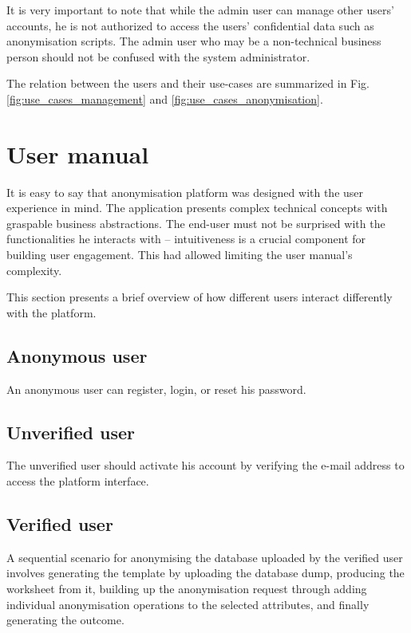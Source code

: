 \documentclass[a4paper,twoside,12pt]{book}
\begin{document}
It is very important to note that while the admin user can manage other users' accounts, he is not authorized to access the users' confidential data such as anonymisation scripts. The admin user who may be a non-technical business person should not be confused with the system administrator.

The relation between the users and their use-cases are summarized in Fig. \ref{fig:use_cases_management} and \ref{fig:use_cases_anonymisation}.

\section{User manual}

It is easy to say that anonymisation platform was designed with the user experience in mind. The application presents complex technical concepts with graspable business abstractions. The end-user must not be surprised with the functionalities he interacts with -- intuitiveness is a crucial component for building user engagement. This had allowed limiting the user manual's complexity.

This section presents a brief overview of how different users interact differently with the platform.

\subsection{Anonymous user}

An anonymous user can register, login, or reset his password.

\subsection{Unverified user}

The unverified user should activate his account by verifying the e-mail address to access the platform interface.

\subsection{Verified user}

A sequential scenario for anonymising the database uploaded by the verified user involves generating the template by uploading the database dump, producing the worksheet from it, building up the anonymisation request through adding individual anonymisation operations to the selected attributes, and finally generating the outcome.
\end{document}

